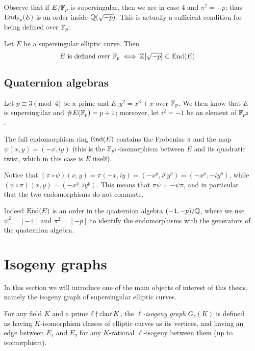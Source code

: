 Observe that if $E/\mathbb{F}_p$ is supersingular, then we are in case 4 and $\pi^2=-p$; thus $\operatorname{End}_{\mathbb{F}_p}(E)$ is an order inside $\mathbb{Q}(\sqrt{-p})$. This is actually a sufficient condition for being defined over $\mathbb{F}_p$:
\begin{proposition}
    Let $E$ be a supersingular elliptic curve. Then
    $$E \text{ is defined over } \mathbb{F}_p\iff \mathbb{Z}[\sqrt{-p}]\subset\operatorname{End}(E)$$
\end{proposition}

\subsection{Quaternion algebras}

\cite{QuatAlg}

\begin{example}
    Let $p\equiv3\pmod4$ be a prime and $E:y^2=x^3+x$ over $\mathbb{F}_p$. We then know that $E$ is supersingular and $\# E(\mathbb{F}_p)=p+1$; moreover, let $i^2=-1$ be an element of $\mathbb{F}_{p^2}$.
    
    The full endomorphism ring $\operatorname{End}(E)$ contains the Frobenius $\pi$ and the map $\psi(x,y)=(-x,iy)$ (this is the $\mathbb{F}_{p^2}$-isomorphism between $E$ and its quadratic twist, which in this case is $E$ itself).
    
    Notice that $(\pi\circ\psi)(x,y)=\pi(-x,iy)=(-x^p,i^py^p)=(-x^p,-iy^p)$, while $(\psi\circ\pi)(x,y)=(-x^y,iy^p)$. This means that $\pi\psi=-\psi\pi$, and in particular that the two endomorphisms do not commute.
    
    Indeed $\operatorname{End}(E)$ is an order in the quaternion algebra $(-1,-p)/\mathbb{Q}$, where we use $\psi^2=[-1]$ and $\pi^2=[-p]$ to identify the endomorphisms with the generators of the quaternion algebra.
\end{example}

\section{Isogeny graphs}
In this section we will introduce one of the main objects of interest of this thesis, namely the isogeny graph of supersingular elliptic curves.

\begin{definition}
    For any field $K$ and a prime $\ell\nmid\operatorname{char} K$, the \emph{$\ell$-isogeny graph} $G_\ell(K)$ is defined as having $K$-isomorphism classes of elliptic curves as its vertices, and having an edge between $E_1$ and $E_2$ for any $K$-rational $\ell$-isogeny between them (up to isomorphism).
\end{definition}

